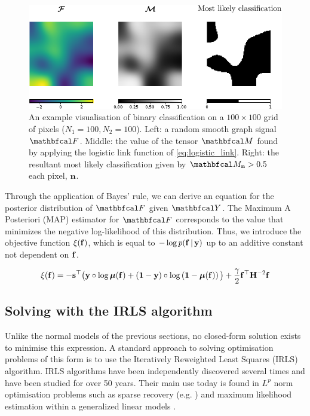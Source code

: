 \begin{figure}[t] 
    \begin{center}
        \includegraphics[width=0.9
        \linewidth]{Figures/logistic_gsr.pdf}
    \end{center}
    \caption[Visualisation of binary classification on a 2D lattice]{An example visualisation of binary classification on a $100 \times 100$ grid of pixels ($N_1 = 100, N_2 = 100$). Left: a random smooth graph signal $\Ft$. Middle: the value of the tensor $\Mt$ found by applying the logistic link function of \cref{eq:logistic_link}. Right: the resultant most likely classification given by $\Mt_{\nn} > 0.5$ each pixel, $\mathbf{n}$.} 
    \label{fig:logistic_gsr}
\end{figure} 
 
Through the application of Bayes' rule, we can derive an equation for the posterior distribution of $\Ft$ given $\Yt$. The Maximum A Posteriori (MAP) estimator for $\Ft$ corresponds to the value that minimizes the negative log-likelihood of this distribution. Thus, we introduce the objective function $\xi(\mathbf{f}) $, which is equal to $ -\log p(\mathbf{f} \, | \, \mathbf{y})$ up to an additive constant not dependent on $\mathbf{f}$.
 
\begin{equation}
    \xi(\mathbf{f}) = -\mathbf{s}^\top \big(\mathbf{y} \circ \log \boldsymbol{\mu}(\mathbf{f}) + \left(\mathbf{1}  - \mathbf{y}\right) \circ \log \left(\mathbf{1} - \boldsymbol{\mu}(\mathbf{f}) \right)\big) + \frac{\gamma}{2} \mathbf{f}^\top \mathbf{H}^{-2} \mathbf{f}
\end{equation}

\subsection{Solving with the IRLS algorithm}

Unlike the normal models of the previous sections, no closed-form solution exists to minimise this expression. A standard approach to solving optimisation problems of this form is to use the Iteratively Reweighted Least Squares (IRLS) algorithm. IRLS algorithms have been independently discovered several times and have been studied for over 50 years. Their main use today is found in $L^p$ norm optimisation problems such as sparse recovery (e.g. \cite{Gorodnitsky1997,Daubechies2010}) and maximum likelihood estimation within a generalized linear models \citep{Nelder1972}. 

